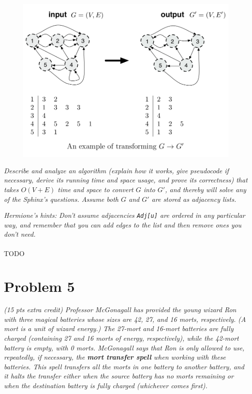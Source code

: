 \documentclass[12pt]{article} \setlength{\oddsidemargin}{0in}
\begin{document}
\begin{figure}[h]
  \centering \includegraphics[width=1\textwidth]{P4}
\end{figure}

\textit{Describe and analyze an algorithm (explain how it works, give
  pseudocode if necessary, derive its running time and space usage,
  and prove its correctness) that takes $O(V + E)$ time and space to
  convert $G$ into $G'$, and thereby will solve any of the Sphinx’s
  questions. Assume both $G$ and $G'$ are stored as adjacency lists.}

\textit{Hermione’s hints: Don’t assume adjacencies \texttt{Adj[u]} are
  ordered in any particular way, and remember that you can add edges
  to the list and then remove ones you don't need.}
\\\\
TODO

\newpage


\section*{Problem 5}

\textit{(15 pts extra credit) Professor McGonagall has provided the
  young wizard Ron with three magical batteries whose sizes are 42,
  27, and 16 morts, respectively. (A mort is a unit of wizard energy.)
  The 27-mort and 16-mort batteries are fully charged (containing 27
  and 16 morts of energy, respectively), while the 42-mort battery is
  empty, with 0 morts. McGonagall says that Ron is only allowed to
  use, repeatedly, if necessary, the \textbf{mort transfer spell} when
  working with these batteries. This spell transfers all the morts in
  one battery to another battery, and it halts the transfer either
  when the source battery has no morts remaining or when the
  destination battery is fully charged (whichever comes first).}
\end{document}

